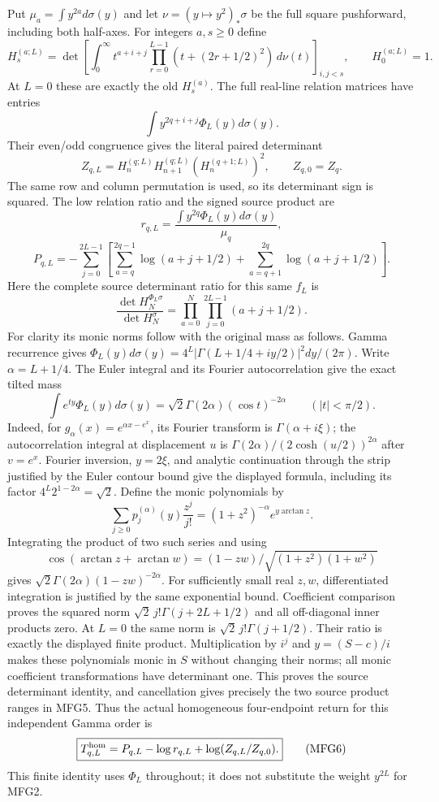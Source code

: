Put $\mu_a=\int y^{2a}d\sigma(y)$ and let $\nu=(y\mapsto y^2)_*\sigma$
be the full square pushforward, including both half-axes. For integers
$a,s\ge0$ define
\[
 H_s^{(a;L)}=\det\left[
    \int_0^\infty t^{a+i+j}
             \prod_{r=0}^{L-1}(t+(2r+1/2)^2)\,d\nu(t)
                  \right]_{i,j<s},\qquad H_0^{(a;L)}=1.
 \tag{MFG3}
\]
At $L=0$ these are exactly the old $H_s^{(a)}$. The full real-line
relation matrices have entries
\[\int y^{2q+i+j}\Phi_L(y)d\sigma(y).\] Their even/odd congruence gives
the literal paired determinant
\[
 Z_{q,L}=H_n^{(q;L)}H_{n+1}^{(q;L)}(H_n^{(q+1;L)})^2,
 \qquad Z_{q,0}=Z_q.
 \tag{MFG4}
\]
The same row and column permutation is used, so its determinant sign
is squared. The low relation ratio and the signed source product are
\[
 r_{q,L}=\frac{\int y^{2q}\Phi_L(y)d\sigma(y)}{\mu_q},
\]
\[
 P_{q,L}=-\sum_{j=0}^{2L-1}
 \left[\sum_{a=q}^{2q-1}\log(a+j+1/2)
       +\sum_{a=q+1}^{2q}\log(a+j+1/2)\right].
 \tag{MFG5}
\]
Here the complete source determinant ratio for this same $f_L$ is
\[
 \frac{\det H_N^{\Phi_L\sigma}}{\det H_N^\sigma}
 =\prod_{a=0}^N\prod_{j=0}^{2L-1}(a+j+1/2).
\]
For clarity its monic norms follow with the original mass as follows.
Gamma recurrence gives
$\Phi_L(y)d\sigma(y)=4^L|\Gamma(L+1/4+iy/2)|^2dy/(2\pi)$.
Write $\alpha=L+1/4$. The Euler integral and its Fourier
autocorrelation give the exact tilted mass
\[
 \int e^{ty}\Phi_L(y)d\sigma(y)
       =\sqrt2\Gamma(2\alpha)(\cos t)^{-2\alpha}
       \qquad(|t|<\pi/2).
\]
Indeed, for $g_\alpha(x)=e^{\alpha x-e^x}$, its Fourier transform is
$\Gamma(\alpha+i\xi)$; the autocorrelation integral at displacement
$u$ is $\Gamma(2\alpha)/(2\cosh(u/2))^{2\alpha}$ after $v=e^x$.
Fourier inversion, $y=2\xi$, and analytic continuation through the
strip justified by the Euler contour bound give the displayed formula,
including its factor $4^L2^{1-2\alpha}=\sqrt2$.
Define the monic polynomials by
\[
 \sum_{j\ge0}p_j^{(\alpha)}(y)\frac{z^j}{j!}
       =(1+z^2)^{-\alpha}e^{y\arctan z}.
\]
Integrating the product of two such series and using
\[\cos(\arctan z+\arctan w)=(1-zw)/\sqrt{(1+z^2)(1+w^2)}\]
gives $\sqrt2\Gamma(2\alpha)(1-zw)^{-2\alpha}$.
For sufficiently small real $z,w$, differentiated integration is
justified by the same exponential bound. Coefficient comparison
proves the squared norm $\sqrt2\,j!\Gamma(j+2L+1/2)$ and all
off-diagonal inner products zero. At $L=0$ the same norm is
$\sqrt2\,j!\Gamma(j+1/2)$. Their ratio is exactly the displayed
finite product. Multiplication by $i^j$ and $y=(S-c)/i$ makes these
polynomials monic in $S$ without changing their norms; all monic
coefficient transformations have determinant one. This proves the
source determinant identity, and cancellation gives precisely the
two source product ranges in MFG5. Thus the actual homogeneous
four-endpoint return for this independent Gamma order is
\[
 \boxed{T_{q,L}^{\rm hom}
       =P_{q,L}-\log r_{q,L}+\log(Z_{q,L}/Z_{q,0}).}
 \tag{MFG6}
\]
This finite identity uses $\Phi_L$ throughout; it does not substitute
the weight $y^{2L}$ for MFG2.


